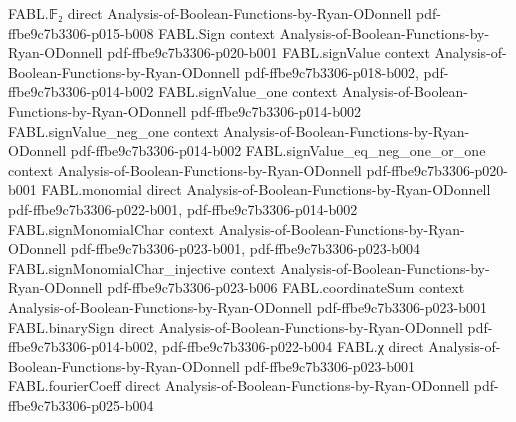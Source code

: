 \begin{theorem}
\label{FABL.measure_realEmpiricalFourierCoeff_sub_ge_le}
\leanok
{}
\proofstep
  {FABL.𝔽₂}
  {direct}
  {Analysis-of-Boolean-Functions-by-Ryan-ODonnell}
  {pdf-ffbe9c7b3306-p015-b008}
\proofstep
  {FABL.Sign}
  {context}
  {Analysis-of-Boolean-Functions-by-Ryan-ODonnell}
  {pdf-ffbe9c7b3306-p020-b001}
\proofstep
  {FABL.signValue}
  {context}
  {Analysis-of-Boolean-Functions-by-Ryan-ODonnell}
  {pdf-ffbe9c7b3306-p018-b002,
    pdf-ffbe9c7b3306-p014-b002}
\proofstep
  {FABL.signValue_one}
  {context}
  {Analysis-of-Boolean-Functions-by-Ryan-ODonnell}
  {pdf-ffbe9c7b3306-p014-b002}
\proofstep
  {FABL.signValue_neg_one}
  {context}
  {Analysis-of-Boolean-Functions-by-Ryan-ODonnell}
  {pdf-ffbe9c7b3306-p014-b002}
\proofstep
  {FABL.signValue_eq_neg_one_or_one}
  {context}
  {Analysis-of-Boolean-Functions-by-Ryan-ODonnell}
  {pdf-ffbe9c7b3306-p020-b001}
\proofstep
  {FABL.monomial}
  {direct}
  {Analysis-of-Boolean-Functions-by-Ryan-ODonnell}
  {pdf-ffbe9c7b3306-p022-b001,
    pdf-ffbe9c7b3306-p014-b002}
\proofstep
  {FABL.signMonomialChar}
  {context}
  {Analysis-of-Boolean-Functions-by-Ryan-ODonnell}
  {pdf-ffbe9c7b3306-p023-b001,
    pdf-ffbe9c7b3306-p023-b004}
\proofstep
  {FABL.signMonomialChar_injective}
  {context}
  {Analysis-of-Boolean-Functions-by-Ryan-ODonnell}
  {pdf-ffbe9c7b3306-p023-b006}
\proofstep
  {FABL.coordinateSum}
  {context}
  {Analysis-of-Boolean-Functions-by-Ryan-ODonnell}
  {pdf-ffbe9c7b3306-p023-b001}
\proofstep
  {FABL.binarySign}
  {direct}
  {Analysis-of-Boolean-Functions-by-Ryan-ODonnell}
  {pdf-ffbe9c7b3306-p014-b002,
    pdf-ffbe9c7b3306-p022-b004}
\proofstep
  {FABL.χ}
  {direct}
  {Analysis-of-Boolean-Functions-by-Ryan-ODonnell}
  {pdf-ffbe9c7b3306-p023-b001}
\proofstep
  {FABL.fourierCoeff}
  {direct}
  {Analysis-of-Boolean-Functions-by-Ryan-ODonnell}
  {pdf-ffbe9c7b3306-p025-b004}
\proofstep

\end{theorem}
